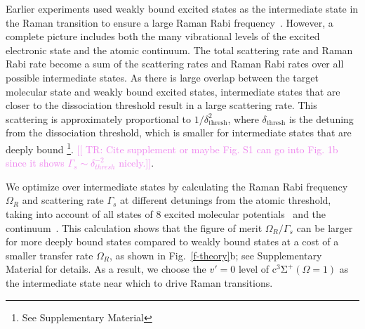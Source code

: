 \documentclass[aps,prl,twocolumn,10pt,superscriptaddress]{revtex4-1}
\newcounter{TRC}
\newcommand{\TR}[1]{\textcolor{violet}{[[\stepcounter{TRC} TR\arabic{TRC}: #1]]}}
\begin{document}
Earlier experiments used weakly bound excited states as the intermediate state
in the Raman transition to ensure a large Raman Rabi frequency~\cite{Wynar2000,Rom2004}.
However, a complete picture includes both the many vibrational levels
of the excited electronic state and the atomic continuum.
The total scattering rate and Raman Rabi rate become a sum of the scattering rates
and Raman Rabi rates over all possible intermediate states.
As there is large overlap between the target molecular state and weakly bound excited states, intermediate states that are closer to the dissociation threshold result in a large scattering rate.
This scattering is approximately proportional to $1/\delta_{\mathrm{thresh}}^2$,
where $\delta_{\mathrm{thresh}}$ is the detuning from the dissociation threshold,
which is smaller for intermediate states that are deeply bound \footnote{See Supplementary Material}. \TR{Cite supplement or maybe Fig. S1 can go into Fig. 1b since it shows $\Gamma_s\sim \delta_{thresh}^{-2}$ nicely.}.


We optimize over intermediate states by calculating the Raman Rabi frequency $\Omega_R$
and scattering rate $\Gamma_s$ at different detunings from the atomic threshold,
taking into account of all states of
8 excited molecular potentials~\cite{Korek2007, Grochola2011, Zaharova2009, Grochola2010, Zabawa2012}
and the continuum~\cite{Liu2017}.
This calculation shows that the figure of merit $\Omega_R/\Gamma_s$
can be larger for more deeply bound states compared to weakly bound states
at a cost of a smaller transfer rate $\Omega_R$, as shown in Fig.~\ref{f-theory}b;
see Supplementary Material for details.
As a result, we choose the $v'=0$ level of $\mathrm{c^3\Sigma^+}(\Omega = 1)$
as the intermediate state near which to drive Raman transitions.
\end{document}
